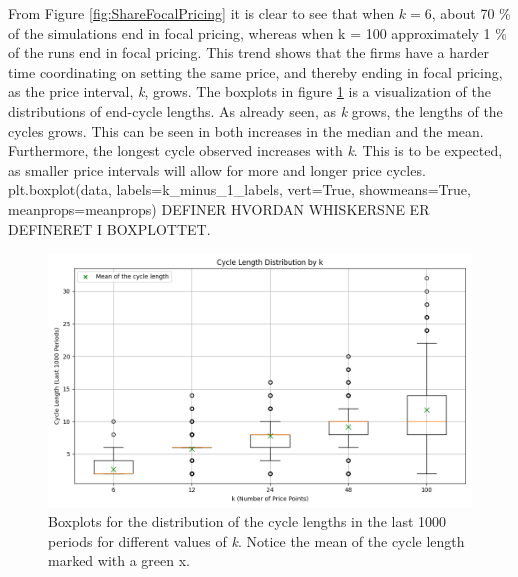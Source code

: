 \documentclass{article}
\begin{document}
From Figure \ref{fig:ShareFocalPricing} it is clear to see that when $k = 6$, about 70 \% of the simulations end in focal pricing, whereas when k = 100 approximately 1 \% of the runs end in focal pricing. This trend shows that the firms have a harder time coordinating on setting the same price, and thereby ending in focal pricing, as the price interval, \textit{k}, grows.
\newline
The boxplots in figure \ref{fig:Boxplot} is a visualization of the distributions of end-cycle lengths. As already seen, as \textit{k} grows, the lengths of the cycles grows. This can be seen in both increases in the median and the mean. Furthermore, the longest cycle observed increases with \textit{k}. This is to be expected, as smaller price intervals will allow for more and longer price cycles.
\newline
plt.boxplot(data, labels=k_minus_1_labels, vert=True, showmeans=True, meanprops=meanprops)
DEFINER HVORDAN WHISKERSNE ER DEFINERET I BOXPLOTTET.

\begin{figure}[H]
    \centering
    \includegraphics[scale = 0.5]{Boxplotv3.png}
    \caption{Boxplots for the distribution of the cycle lengths in the last 1000 periods for different values of \textit{k}. Notice the mean of the cycle length marked with a green x.}
    \label{fig:Boxplot}
\end{figure}
\end{document}
